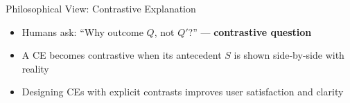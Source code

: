 \documentclass[11pt,compress,t,notes=noshow, aspectratio=169, xcolor=table, usenames,dvipsnames]{beamer}
\begin{document}
\begin{frame}{Philosophical View: Contrastive Explanation}
  \begin{itemize}%
    \item Humans ask: “Why outcome $Q$, not $Q'$?”  — \textbf{contrastive question}  
    \item A CE becomes contrastive when its antecedent $S$ is shown side-by-side with reality
    \item Designing CEs with explicit contrasts improves user satisfaction and clarity
  \end{itemize}
\end{frame}

















\end{document}
